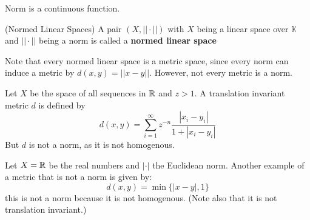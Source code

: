 \begin{remark}
    Norm is a continuous function.
\end{remark}

\begin{defn}
(Normed Linear Spaces) A pair $(X, ||\cdot||)$ with $X$ being a linear space over $\mathbb{K}$ and 
                    $||\cdot||$ being a norm is called a \textbf{normed linear space}
\end{defn} 

Note that every normed linear space is a metric space, since every norm can induce a metric by $d(x,y)=||x-y||$. 
However, not every metric is a norm.  

\begin{eg}
    Let $X$ be the space of all sequences in $\mathbb{R}$ and $z>1$. A translation invariant metric $d$ is defined by  
    \begin{equation*}
        d(x,y) = \sum_{i=1}^{\infty} z^{-n} \dfrac{|x_i-y_i|}{1+|x_i-y_i|}
    \end{equation*}  
    But $d$ is not a norm, as it is not homogenous.
\end{eg}  

\begin{eg}
    Let $X=\mathbb{R}$ be the real numbers and $|\cdot|$ the Euclidean norm. Another example of a metric that is not a norm 
    is given by:
    \begin{equation*}
        d(x,y) = \min \{|x-y|, 1\}
    \end{equation*}  
    this is not a norm because it is not homogenous. (Note also that it is not translation invariant.)
\end{eg}  



